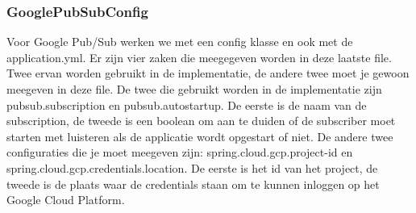 \subsubsection{GooglePubSubConfig}
Voor Google Pub/Sub werken we met een config klasse en ook met de application.yml. Er zijn vier zaken die meegegeven worden in deze laatste file. Twee ervan worden gebruikt in de implementatie, de andere twee moet je gewoon meegeven in deze file. De twee die gebruikt worden in de implementatie zijn pubsub.subscription en pubsub.autostartup. De eerste is de naam van de subscription, de tweede is een boolean om aan te duiden of de subscriber moet starten met luisteren als de applicatie wordt opgestart of niet. De andere twee configuraties die je moet meegeven zijn: spring.cloud.gcp.project-id en spring.cloud.gcp.credentials.location. De eerste is het id van het project, de tweede is de plaats waar de credentials staan om te kunnen inloggen op het Google Cloud Platform. 

